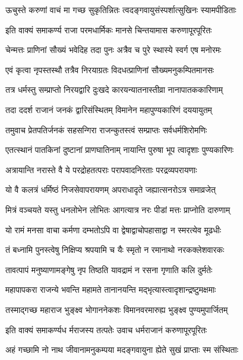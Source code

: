 \twolineshloka
{ऊचुस्ते करुणां वाचं मा गच्छ सुकृतिन्नितः}
{त्वदङ्गवायुसंस्पर्शात्सुखिनः स्यामपीडिताः}%

\twolineshloka
{इति वाक्यं समाकर्ण्य राजा परमधार्मिकः}
{मानसे चिन्तयामास करुणापूरपूरितः}%

\twolineshloka
{चेन्मत्तः प्राणिनां सौख्यं भवेदिह तदा पुनः}
{अत्रैव च पुरे स्थास्ये स्वर्ग एष मनोरमः}%

\twolineshloka
{एवं कृत्वा नृपस्तस्थौ तत्रैव निरयाग्रतः}
{विदधत्प्राणिनां सौख्यमनुकम्पितमानसः}%

\twolineshloka
{तत्र धर्मस्तु सम्प्राप्तो निरयद्वारि दुःखदे}
{कारयन्यातनास्तीव्रा नानापातककारिणाम्}%

\twolineshloka
{तदा ददर्श राजानं जनकं द्वारिसंस्थितम्}
{विमानेन महापुण्यकारिणं दययायुतम्}%

\twolineshloka
{तमुवाच प्रेतपतिर्जनकं सहसन्गिरा}
{राजन्कुतस्त्वं सम्प्राप्तः सर्वधर्मशिरोमणिः}%

\twolineshloka
{एतत्स्थानं पातकिनां दुष्टानां प्राणघातिनाम्}
{नायान्ति पुरुषा भूप त्वादृशाः पुण्यकारिणः}%

\twolineshloka
{अत्रायान्ति नरास्ते वै ये परद्रोहतत्पराः}
{परापवादनिरताः परद्रव्यपरायणाः}%

\twolineshloka
{यो वै कलत्रं धर्मिष्ठं निजसेवापरायणम्}
{अपराधादृते जह्यात्सनरोऽत्र समाव्रजेत्}%

\twolineshloka
{मित्रं वञ्चयते यस्तु धनलोभेन लोभितः}
{आगत्यात्र नरः पीडां मत्तः प्राप्नोति दारुणाम्}%

\twolineshloka
{यो रामं मनसा वाचा कर्मणा दम्भतोऽपि वा}
{द्वेषाद्वाचोपहासाद्वा न स्मरत्येव मूढधीः}%

\twolineshloka
{तं बध्नामि पुनस्त्वेषु निक्षिप्य श्रपयामि च}
{यैः स्मृतो न रमानाथो नरकक्लेशवारकः}%

\twolineshloka
{तावत्पापं मनुष्याणामङ्गेषु नृप तिष्ठति}
{यावद्रामं न रसना गृणाति कलि दुर्मतेः}%

\twolineshloka
{महापापकरा राजन्ये भवन्ति महामते}
{तानानयन्ति मद्भृत्यास्त्वादृशान्द्रष्टुमक्षमाः}%

\twolineshloka
{तस्माद्गच्छ महाराज भुङ्क्ष्व भोगाननेकशः}
{विमानवरमारुह्य भुङ्क्ष्व पुण्यमुपार्जितम्}%

\twolineshloka
{इति वाक्यं समाकर्ण्यध र्मराजस्य तत्पतेः}
{उवाच धर्मराजानं करुणापूरपूरितः}%


\twolineshloka
{अहं गच्छामि नो नाथ जीवानामनुकम्पया}
{मदङ्गवायुना ह्येते सुखं प्राप्ताः स्म संस्थिताः}%

